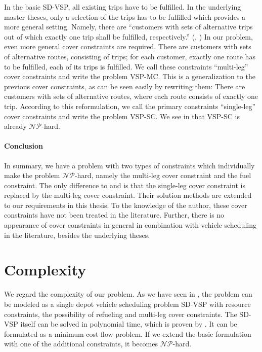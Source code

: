 In the basic SD-VSP, all existing trips have to be fulfilled. In the underlying master theses, only a selection of the trips has to be fulfilled which provides a more general setting. Namely, there are \enquote{customers with sets of alternative trips out of which exactly one trip shall be fulfilled, respectively.} (\cite[p.~10]{Kaiser}, \cite[p.~10]{Knoll}) In our problem, even more general cover constraints are required. There are customers with sets of alternative routes, consisting of trips; for each customer, exactly one route has to be fulfilled, \ie each of its trips is fulfilled. We call these constraints \enquote{multi-leg} cover constraints and write the problem VSP-MC. This is a generalization to the previous cover constraints, as can be seen easily by rewriting them: There are customers with sets of alternative routes, where each route consists of exactly one trip. According to this reformulation, we call the primary constraints \enquote{single-leg} cover constraints and write the problem VSP-SC. We see in  that VSP-SC is already $\mathcal{NP}$-hard.

\paragraph{Conclusion} \parfill

In summary, we have a problem with two types of constraints which individually make the problem $\mathcal{NP}$-hard, namely the multi-leg cover constraint and the fuel constraint. The only difference to \cite{Kaiser} and \cite{Knoll} is that the single-leg cover constraint is replaced by the multi-leg cover constraint. Their solution methods are extended to our requirements in this thesis. To the knowledge of the author, these cover constraints have not been treated in the literature. Further, there is no appearance of cover constraints in general in combination with vehicle scheduling in the literature, besides the underlying theses. 


\section{Complexity}
\label{sec:complexity}

We regard the complexity of our problem. As we have seen in , the problem can be modeled as a single depot vehicle scheduling problem SD-VSP with resource constraints, the possibility of refueling and multi-leg cover constraints. The SD-VSP itself can be solved in polynomial time, which is proven by \cite{Dantzig_Fulkerson}. It can be formulated as a minimum-cost flow problem. If we extend the basic formulation with one of the additional constraints, it becomes $\mathcal{NP}$-hard.

